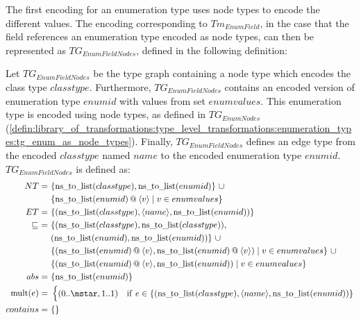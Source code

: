 The first encoding for an enumeration type uses node types to encode the different values. The encoding corresponding to $Tm_{EnumField}$, in the case that the field references an enumeration type encoded as node types, can then be represented as $TG_{EnumFieldNodes}$, defined in the following definition:

\begin{defin}
\label{defin:library_of_transformations:type_level_transformations:enum_fields:tg_enum_as_node_types_field_as_edge_type}
Let $TG_{EnumFieldNodes}$ be the type graph containing a node type which encodes the class type $classtype$.
Furthermore, $TG_{EnumFieldNodes}$ contains an encoded version of enumeration type $enumid$ with values from set $enumvalues$. This enumeration type is encoded using node types, as defined in $TG_{EnumNodes}$ (\cref{defin:library_of_transformations:type_level_transformations:enumeration_types:tg_enum_as_node_types}). Finally, $TG_{EnumFieldNodes}$ defines an edge type from the encoded $classtype$ named $name$ to the encoded enumeration type $enumid$. $TG_{EnumFieldNodes}$ is defined as:
\begin{align*}
NT =\ &\{\mathrm{ns\_\!to\_\!list}(classtype), \mathrm{ns\_\!to\_\!list}(enumid)\}\ \cup \\&\{ \mathrm{ns\_\!to\_\!list}(enumid) \append \langle v \rangle \mid v \in enumvalues \}\\
ET =\ &\{(\mathrm{ns\_\!to\_\!list}(classtype), \langle name \rangle, \mathrm{ns\_\!to\_\!list}(enumid))\} \\
\!\!\sqsubseteq\ =\ &\{(\mathrm{ns\_\!to\_\!list}(classtype), \mathrm{ns\_\!to\_\!list}(classtype)),\ \\& (\mathrm{ns\_\!to\_\!list}(enumid), \mathrm{ns\_\!to\_\!list}(enumid))\}\ \cup \\&
\{(\mathrm{ns\_\!to\_\!list}(enumid) \append \langle v \rangle, \mathrm{ns\_\!to\_\!list}(enumid) \append \langle v \rangle) \mid v \in enumvalues \}\ \cup \\&
\{(\mathrm{ns\_\!to\_\!list}(enumid) \append \langle v \rangle, \mathrm{ns\_\!to\_\!list}(enumid)) \mid v \in enumvalues \} \\
abs =\ &\{\mathrm{ns\_\!to\_\!list}(enumid)\} \\
\mathrm{mult}(e) =\ &\begin{cases}
    (0..\mstar, 1..1) &\mathrm{if}\ e \in \{(\mathrm{ns\_\!to\_\!list}(classtype), \langle name \rangle, \mathrm{ns\_\!to\_\!list}(enumid))\}
\end{cases} \\
contains =\ &\{\}
\end{align*}
\end{defin}

